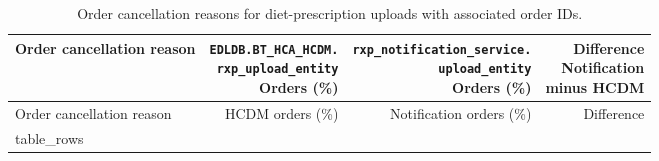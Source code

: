 \begin{longtable}{@{}lrrr@{}}
\caption{Order cancellation reasons for diet-prescription uploads with associated order IDs.}
\label{tab:diet-upload-source-cancel-reasons}\\
\toprule
Order cancellation reason & \shortstack{\texttt{EDLDB.BT\_HCA\_HCDM.}\\\texttt{rxp\_upload\_entity}\\Orders (\%)} & \shortstack{\texttt{rxp\_notification\_service.}\\\texttt{upload\_entity}\\Orders (\%)} & \shortstack{Difference\\Notification\\minus HCDM} \\
\midrule
\endfirsthead
\toprule Order cancellation reason & HCDM orders (\%) & Notification orders (\%) & Difference \\
\midrule
\endhead
{{ table_rows }}
\bottomrule
\end{longtable}
